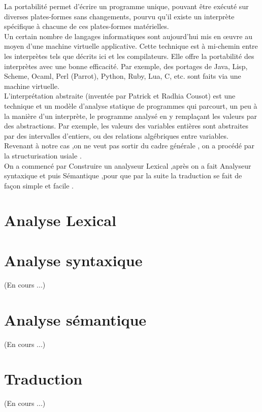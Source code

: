 La portabilité permet d'écrire un programme unique, pouvant être exécuté sur diverses plates-formes sans changements, pourvu qu'il existe un interprète spécifique à chacune de ces plates-formes matérielles.
\\[0.5cm]
Un certain nombre de langages informatiques sont aujourd'hui mis en œuvre au moyen d'une machine virtuelle applicative. Cette technique est à mi-chemin entre les interprètes tels que décrits ici et les compilateurs. Elle offre la portabilité des interprètes avec une bonne efficacité. Par exemple, des portages de Java, Lisp, Scheme, Ocaml, Perl (Parrot), Python, Ruby, Lua, C, etc. sont faits via une machine virtuelle.
\\[0.5cm]
L'interprétation abstraite (inventée par Patrick et Radhia Cousot) est une technique et un modèle d'analyse statique de programmes qui parcourt, un peu à la manière d'un interprète, le programme analysé en y remplaçant les valeurs par des abstractions. Par exemple, les valeurs des variables entières sont abstraites par des intervalles d'entiers, ou des relations algébriques entre variables.
\\[0.5cm]
Revenant à notre cas ,on ne veut pas sortir du cadre générale , on a procédé par la structurisation usiale .
\\[0.5cm]
On a commencé par Construire un analyseur Lexical ,après on a fait Analyseur syntaxique et puis Sémantique ,pour que par la suite la traduction se fait de façon simple et facile . 



\section{Analyse Lexical}


\section{Analyse syntaxique}

(En cours ...)


\section{Analyse sémantique}
(En cours ...)

\section{Traduction}
(En cours ...)


